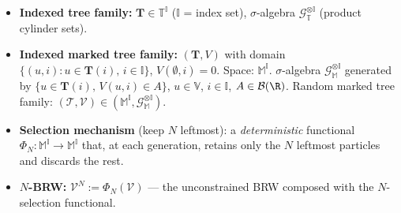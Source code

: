 \begin{itemize}
    \item \textbf{Indexed tree family:} $\boldsymbol T\in\mathbb T^{\mathbb I}$ ($\mathbb I$ = index set),
    $\sigma$-algebra $\mathcal G_{\mathbb T}^{\otimes\mathbb I}$ (product cylinder sets).
    \item \textbf{Indexed marked tree family:} $(\boldsymbol T,V)$ with domain
    $\{(u,i):u\in\boldsymbol T(i),\,i\in\mathbb I\}$, $V(\emptyset,i)=0$.
    Space: $\mathbb M^{\mathbb I}$.
    $\sigma$-algebra $\mathcal G_{\mathbb M}^{\otimes\mathbb I}$ generated by
    $\{u\in\boldsymbol T(i),\,V(u,i)\in A\}$, $u\in\mathbb V$, $i\in\mathbb I$, $A\in\mathcal B(\R)$.
    Random marked tree family: $(\boldsymbol{\mathcal T},\mathcal V)\in(\mathbb M^{\mathbb I},\mathcal G_{\mathbb M}^{\otimes\mathbb I})$.
    \item \textbf{Selection mechanism} (keep $N$ leftmost):
    a \emph{deterministic} functional $\Phi_N:\mathbb M^{\mathbb I}\to\mathbb M^{\mathbb I}$ that, at each generation, retains
    only the $N$ leftmost particles and discards the rest.
    \item \textbf{$N$-BRW:} $\mathcal V^N:=\Phi_N(\mathcal V)$ —
    the unconstrained BRW composed with the $N$-selection functional.
\end{itemize}

